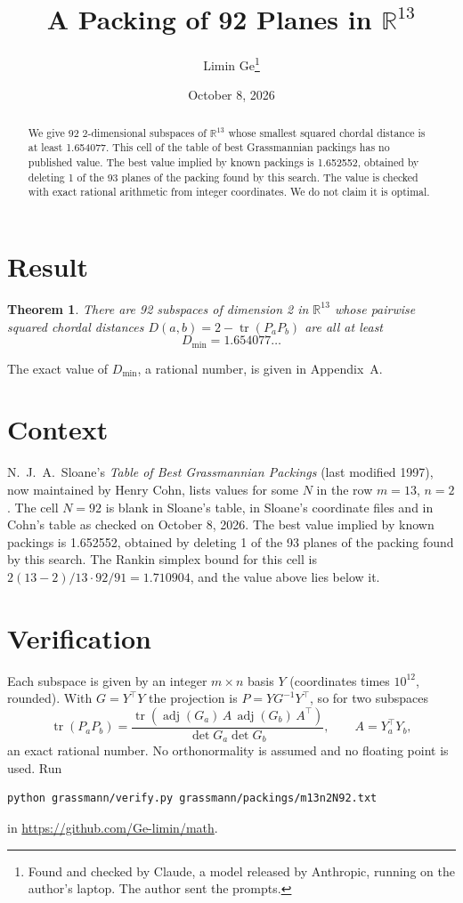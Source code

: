 \documentclass[11pt,a4paper]{article}
\title{A Packing of 92 Planes in $\mathbb{R}^{13}$}
\author{Limin Ge\thanks{Found and checked by Claude, a model released by Anthropic, running on the author's laptop. The author sent the prompts.}}
\date{October 8, 2026}
\newtheorem*{theorem}{Theorem}
\begin{document}
\maketitle
\begin{abstract}
We give 92 2-dimensional subspaces of $\mathbb{R}^{13}$ whose smallest squared chordal distance is at least 1.654077. This cell of the table of best Grassmannian packings has no published value. The best value implied by known packings is 1.652552, obtained by deleting 1 of the 93 planes of the packing found by this search. The value is checked with exact rational arithmetic from integer coordinates. We do not claim it is optimal.
\end{abstract}

\section{Result}
\begin{theorem}
There are 92 subspaces of dimension 2 in $\mathbb{R}^{13}$ whose pairwise squared chordal distances $D(a,b) = 2 - \operatorname{tr}(P_aP_b)$ are all at least
\[ D_{\min} = 1.654077\ldots \]
\end{theorem}
The exact value of $D_{\min}$, a rational number, is given in Appendix~A.


\section{Context}
N.~J.~A.~Sloane's \emph{Table of Best Grassmannian Packings} (last modified 1997), now maintained by Henry Cohn, lists values for some $N$ in the row $m=13$, $n=2$. The cell $N=92$ is blank in Sloane's table, in Sloane's coordinate files and in Cohn's table as checked on October 8, 2026. The best value implied by known packings is 1.652552, obtained by deleting 1 of the 93 planes of the packing found by this search. The Rankin simplex bound for this cell is $2(13-2)/13\cdot 92/91 = 1.710904$, and the value above lies below it.


\section{Verification}
Each subspace is given by an integer $m\times n$ basis $Y$ (coordinates times $10^{12}$, rounded). With $G=Y^\top Y$ the projection is $P=YG^{-1}Y^\top$, so for two subspaces
\[ \operatorname{tr}(P_aP_b)=\frac{\operatorname{tr}(\operatorname{adj}(G_a)\,A\,\operatorname{adj}(G_b)\,A^\top)}{\det G_a\det G_b},\qquad A=Y_a^\top Y_b, \]
an exact rational number. No orthonormality is assumed and no floating point is used. Run
\begin{verbatim}
python grassmann/verify.py grassmann/packings/m13n2N92.txt
\end{verbatim}
in \url{https://github.com/Ge-limin/math}.
\end{document}
